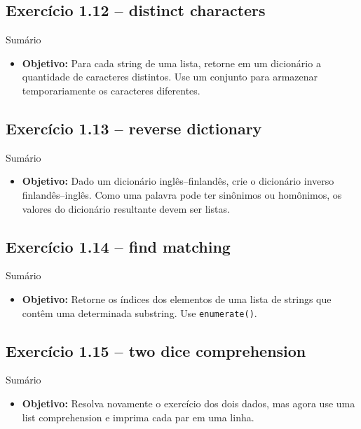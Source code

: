 \documentclass[11pt,a4paper]{article}
\begin{document}
\subsection*{Exercício 1.12 -- distinct characters}
\begin{exercicio}{Sumário}
\begin{itemize}
    \item \textbf{Objetivo:} Para cada string de uma lista, retorne em um dicionário a quantidade de caracteres distintos. Use um conjunto para armazenar temporariamente os caracteres diferentes.
\end{itemize}
\end{exercicio}

\subsection*{Exercício 1.13 -- reverse dictionary}
\begin{exercicio}{Sumário}
\begin{itemize}
    \item \textbf{Objetivo:} Dado um dicionário inglês--finlandês, crie o dicionário inverso finlandês--inglês. Como uma palavra pode ter sinônimos ou homônimos, os valores do dicionário resultante devem ser listas.
\end{itemize}
\end{exercicio}

\subsection*{Exercício 1.14 -- find matching}
\begin{exercicio}{Sumário}
\begin{itemize}
    \item \textbf{Objetivo:} Retorne os índices dos elementos de uma lista de strings que contêm uma determinada substring. Use \texttt{enumerate()}.
\end{itemize}
\end{exercicio}

\subsection*{Exercício 1.15 -- two dice comprehension}
\begin{exercicio}{Sumário}
\begin{itemize}
    \item \textbf{Objetivo:} Resolva novamente o exercício dos dois dados, mas agora use uma list comprehension e imprima cada par em uma linha.
\end{itemize}
\end{exercicio}
\end{document}
